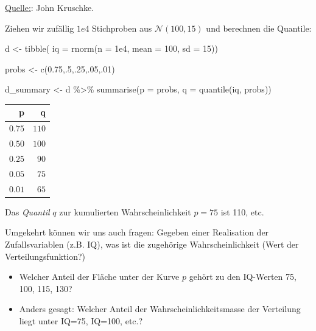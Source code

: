 \documentclass[
  a4paper,
  DIV=11]{scrreprt}
\newenvironment{Shaded}{\begin{snugshade}}{\end{snugshade}}
\newcommand{\AttributeTok}[1]{\textcolor[rgb]{0.40,0.45,0.13}{#1}}
\newcommand{\DecValTok}[1]{\textcolor[rgb]{0.68,0.00,0.00}{#1}}
\newcommand{\FloatTok}[1]{\textcolor[rgb]{0.68,0.00,0.00}{#1}}
\newcommand{\FunctionTok}[1]{\textcolor[rgb]{0.28,0.35,0.67}{#1}}
\newcommand{\NormalTok}[1]{\textcolor[rgb]{0.00,0.23,0.31}{#1}}
\newcommand{\OtherTok}[1]{\textcolor[rgb]{0.00,0.23,0.31}{#1}}
\newcommand{\SpecialCharTok}[1]{\textcolor[rgb]{0.37,0.37,0.37}{#1}}
\providecommand{\tightlist}{%
  \setlength{\itemsep}{0pt}\setlength{\parskip}{0pt}}\usepackage{longtable,booktabs,array}
\theoremstyle{definition}
\theoremstyle{remark}
\begin{document}
\href{https://jkkweb.sitehost.iu.edu/KruschkeFreqAndBayesAppTutorial.html\#data_are_described_by_mathematical_models}{Quelle:}:
John Kruschke.

Ziehen wir zufällig \(1e4\) Stichproben aus \(\mathcal{N}(100,15)\) und
berechnen die Quantile:

\begin{Shaded}
\begin{Highlighting}[]
\NormalTok{d }\OtherTok{\textless{}{-}}
  \FunctionTok{tibble}\NormalTok{(}
  \AttributeTok{iq =} \FunctionTok{rnorm}\NormalTok{(}\AttributeTok{n =} \FloatTok{1e4}\NormalTok{, }
             \AttributeTok{mean =} \DecValTok{100}\NormalTok{, }
             \AttributeTok{sd =} \DecValTok{15}\NormalTok{))}

\NormalTok{probs }\OtherTok{\textless{}{-}} \FunctionTok{c}\NormalTok{(}\FloatTok{0.75}\NormalTok{,.}\DecValTok{5}\NormalTok{,.}\DecValTok{25}\NormalTok{,.}\DecValTok{05}\NormalTok{,.}\DecValTok{01}\NormalTok{)}

\NormalTok{d\_summary }\OtherTok{\textless{}{-}}\NormalTok{ d }\SpecialCharTok{\%\textgreater{}\%} 
  \FunctionTok{summarise}\NormalTok{(}\AttributeTok{p =}\NormalTok{ probs,}
            \AttributeTok{q =} \FunctionTok{quantile}\NormalTok{(iq, probs))}
\end{Highlighting}
\end{Shaded}

\begin{longtable}{rr}
\toprule
p & q \\ 
\midrule
$0.75$ & $110$ \\ 
$0.50$ & $100$ \\ 
$0.25$ & $90$ \\ 
$0.05$ & $75$ \\ 
$0.01$ & $65$ \\ 
\bottomrule
\end{longtable}

Das \emph{Quantil} \(q\) zur kumulierten Wahrscheinlichkeit \(p=75\) ist
110, etc.

Umgekehrt können wir uns auch fragen: Gegeben einer Realisation der
Zufallsvariablen (z.B. IQ), was ist die zugehörige Wahrscheinlichkeit
(Wert der Verteilungsfunktion?)

\begin{itemize}
\tightlist
\item
  Welcher Anteil der Fläche unter der Kurve \(p\) gehört zu den
  IQ-Werten 75, 100, 115, 130?
\item
  Anders gesagt: Welcher Anteil der Wahrscheinlichkeitsmasse der
  Verteilung liegt unter IQ=75, IQ=100, etc.?
\end{itemize}
\end{document}
